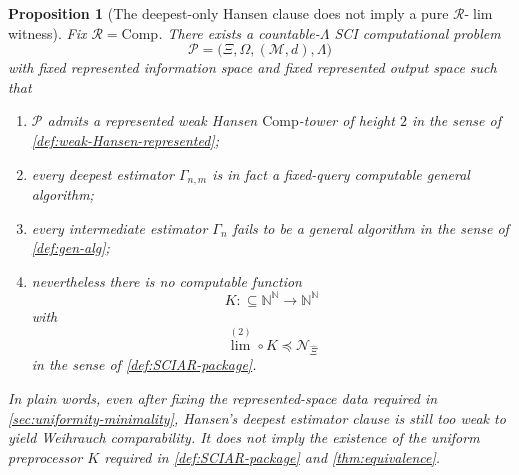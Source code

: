 \documentclass{lmcs} %
\theoremstyle{plain}
\theoremstyle{plain}
\newtheorem{proposition}[theorem]{Proposition}
\theoremstyle{definition}
\theoremstyle{remark}
\theoremstyle{definition}
\theoremstyle{remark}
\numberwithin{equation}{section}
\newcommand{\Lim}{\operatorname{lim}}
\newcommand{\Limi}[1]{\Lim^{(#1)}}
\begin{document}
\begin{proposition}[The deepest-only Hansen clause does not imply a pure $\mathcal R$-$\Lim$ witness]\label{prop:weak-Hansen-no-K}
	Fix $\mathcal R =\mathrm{Comp}$.  There exists a countable-$\Lambda$ SCI computational problem
	\[
	\mathcal P=\bigl( \Xi,\Omega,(\mathcal M,d),\Lambda \bigr)
	\]
	with fixed represented information space and fixed represented output space such that
	\begin{enumerate}
		\item $\mathcal P$ admits a represented weak Hansen $\mathrm{Comp}$-tower of height $2$ in the sense of \cref{def:weak-Hansen-represented};
		\item every deepest estimator $\Gamma_{n,m}$ is in fact a fixed-query computable general
		algorithm;
		\item every intermediate estimator $\Gamma_n$ fails to be a general algorithm in the
		sense of \cref{def:gen-alg};
		\item nevertheless there is \textit{no} computable function
		\[
		K\colon\subseteq \mathbb N^{\mathbb N}\to\mathbb N^{\mathbb N}
		\]
		with
		\[
		\Limi{2} \circ K \preceq \mathcal N_{\widehat{\Xi}}
		\]
		in the sense of \cref{def:SCIAR-package}.
	\end{enumerate}
	In plain words, even after fixing the represented-space data required in \cref{sec:uniformity-minimality},
	Hansen's deepest estimator clause is still too weak to yield Weihrauch comparability. It does \textit{not} imply the existence of the uniform preprocessor $K$ required in \cref{def:SCIAR-package} and \cref{thm:equivalence}.
\end{proposition}
\end{document}
